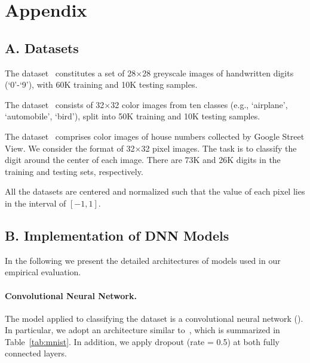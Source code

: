 
\section*{Appendix}

\subsection*{A. Datasets}


The \mnist dataset~\cite{mnist} constitutes a set of 28$\times$28 greyscale images of handwritten digits (`0'-`9'), with 60K training and 10K testing samples.

The \cifar dataset~\cite{cifar} consists of 32$\times$32 color images from ten classes (e.g., `airplane', `automobile', `bird'), split into 50K training and 10K testing samples.


The \svhn dataset~\cite{svhn} comprises color images of house numbers collected by Google Street View. We consider the format of 32$\times$32 pixel images. The task is to classify the digit around the center of each image. There are 73K and 26K digits in the training and testing sets, respectively.

All the datasets are centered and normalized such that the value of each pixel lies in the interval of $[-1, 1]$.


\subsection*{B. Implementation of DNN Models}
\label{sec:app:dnn}

In the following we present the detailed architectures of \dnn models used in our empirical evaluation.

\paragraph*{Convolutional Neural Network.\;}
The \dnn model applied to classifying the \mnist dataset is a convolutional neural network (\cnn). In particular, we adopt an architecture similar to~\cite{Papernot:2016:sp}, which is summarized in Table~\ref{tab:mnist}. In addition, we apply dropout (rate = 0.5) at both fully connected layers.

